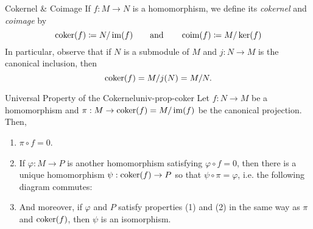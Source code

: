 \begin{defn}{Cokernel \& Coimage}{}
	If $f : M \to N$ is a homomorphism, we define its \emph{cokernel} and \emph{coimage} by
	\[
		\operatorname{coker}(f) \coloneq N / \operatorname{im}(f) \qquad \text{and} \qquad \operatorname{coim}(f) \coloneq M / \ker(f)
	\]
	In particular, observe that if $N$ is a submodule of $M$ and $j : N \to M$ is the canonical inclusion, then
	\[
		\operatorname{coker}(f) = M / j(N) = M / N.
	\]
\end{defn}

\begin{theorem}{Universal Property of the Cokernel}{univ-prop-coker}
	Let $f : N \to M$ be a homomorphism and $\pi : M \to \operatorname{coker}(f) = M / \operatorname{im}(f)$ be the canonical projection.
	Then,
	\begin{enumerate}
		\item $\pi \circ f = 0$.
		\item If $\varphi : M \to P$ is another homomorphism satisfying $\varphi \circ f = 0$, then there is a unique homomorphism $\psi : \operatorname{coker}(f) \to P$ so that $\psi \circ \pi = \varphi$, i.e.
		      the following diagram commutes:
		      \begin{figure}[H]
			      \centering
		      \end{figure}
		\item And moreover, if $\varphi$ and $P$ satisfy properties (1) and (2) in the same way as $\pi$ and $\operatorname{coker}(f)$, then $\psi$ is an isomorphism.
	\end{enumerate}
\end{theorem}
